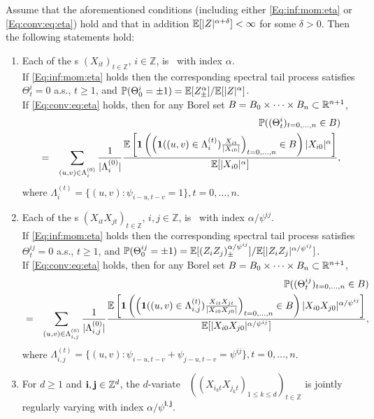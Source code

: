 \begin{proposition}\label{prop:rv:2} Assume that the aforementioned conditions (including either \eqref{Eq:inf:mom:eta} or \eqref{Eq:conv:eq:eta}) hold and that in addition ${\mathbb E}[|Z|^{\alpha+\delta}]<\infty$ for some $\delta>0$. Then the following statements hold: 
\begin{enumerate}
\item
Each of the \seq s 
$(X_{it})_{t \in \mathbb{Z}}$, $i \in \mathbb{Z}$, is \regvary\ with index $\alpha$.\\[1mm]
If  \eqref{Eq:inf:mom:eta} holds then the corresponding spectral 
tail process satisfies $\Theta_t^{i}=0$ a.s., $t\ge 1$, and
$ {\mathbb P}(\Theta^{i}_0=\pm 1)={\mathbb E}[Z_{\pm}^{\alpha}]/{\mathbb E}[|Z|^{\alpha}]$.\\[1mm]
If \eqref{Eq:conv:eq:eta} holds, then for any Borel set $B=B_0\times\cdots \times B_n\subset {\mathbb R}^{n+1}$,
\begin{eqnarray}
  && {\mathbb P}((\Theta^{i}_t)_{t=0,\ldots,n} \in B) \label{Eq:theta:law:1} \\
  &=&
  \sum_{(u,v) \in \Lambda_i^{(0)}}\frac{1}{|\Lambda_i^{(0)}
    |}\frac{{\mathbb E}\left[\mathbf{1}\left(\left(\mathbf{1}((u,v) \in
          \Lambda_i^{(t)})\frac{X_{it}}{|X_{i0}|}\right)_{t=0, \ldots,
          n} \in B
      \right)|X_{i0}|^{\alpha}\right]}{{\mathbb E}[|X_{i0}|^{\alpha}]},
  \nonumber
\end{eqnarray}
where $\Lambda_i^{(t)}=\{(u,v):\psi_{i-u,t-v}=1 \}, t=0, \ldots, n$. 
\item
Each of the \seq s $(X_{it}X_{jt})_{t \in \mathbb{Z}}$, $i,j\in \mathbb{Z}$, is \regvary\ with index  $\alpha/\psi^{ij}$.\\[1mm] 
If \eqref{Eq:inf:mom:eta} holds then the corresponding spectral tail process satisfies $\Theta_t^{ij}=0$ a.s., $t\ge 1$, and
${\mathbb P}(\Theta^{ij}_0=\pm 1)={\mathbb E}[(Z_iZ_j)_{\pm}^{\alpha/\psi^{ij}}]/{\mathbb E}[|Z_iZ_j|^{\alpha/\psi^{ij}}]$.\\[1mm]
If \eqref{Eq:conv:eq:eta} holds, then for any Borel set $B=B_0\times\cdots \times B_n\subset {\mathbb R}^{n+1}$, 
\begin{eqnarray}
  && {\mathbb P}(( \Theta^{ij}_t)_{t=0,\ldots,n} \in B) \label{Eq:theta:law:2} \\
  &=&
  \sum_{(u,v) \in
   \Lambda_{i,j}^{(0)}}\frac{1}{|\Lambda_{i,j}^{(0)}
   |}\frac{{\mathbb E}\left[\mathbf{1}\left(\left(\mathbf{1}((u,v) \in
         \Lambda_{i,j}^{(t)})\frac{X_{it}X_{jt}}{|X_{i0}X_{j0}|}\right)_{t=0,
         \ldots, n} \in B
     \right)|X_{i0}X_{j0}|^{\alpha/\psi^{ij}}\right]}{{\mathbb E}[|X_{i0}X_{j0}|^{\alpha/\psi^{ij}}]},
 \nonumber
\end{eqnarray}
where $\Lambda_{i,j}^{(t)}=\{(u,v):\psi_{i-u,t-v}+\psi_{j-u,t-v}=\psi^{ij}\}, t=0, \ldots, n$. 
\item
For $d\geq 1$ and $\mathbf{i},\mathbf{j}\in {\mathbb Z}^d$, the $d$-variate \seq\ $((X_{i_kt}X_{j_kt})_{1\leq k \leq d})_{t \in \mathbb{Z}}$ 
is jointly regularly varying with index $\alpha/\psi^{\mathbf{i},\mathbf{j}}$.
\end{enumerate}
\end{proposition}
